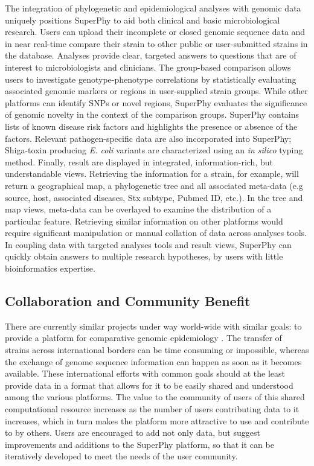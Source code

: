 \documentclass[a4paper,twoside]{article}
\begin{document}
The integration of phylogenetic and epidemiological analyses with genomic data uniquely positions SuperPhy to aid both clinical and basic microbiological research. Users can upload their incomplete or closed genomic sequence data and in near real-time compare their strain to other public or user-submitted strains in the database. Analyses provide clear, targeted answers to questions that are of interest to microbiologists and clinicians.  The group-based comparison allows users to investigate genotype-phenotype correlations by statistically evaluating associated genomic markers or regions in user-supplied strain groups. While other platforms can identify SNPs or novel regions, SuperPhy evaluates the significance of genomic novelty in the context of the comparison groups. SuperPhy contains lists of known disease risk factors and highlights the presence or absence of the factors. Relevant pathogen-specific data are also incorporated into SuperPhy; Shiga-toxin producing \textit{E. coli} variants are characterized using an \textit{in silico} typing method. Finally, result are displayed in integrated, information-rich, but understandable views. Retrieving the information for a strain, for example, will return a geographical map, a phylogenetic tree and all associated meta-data (e.g source, host, associated diseases, Stx subtype, Pubmed ID, etc.). In the tree and map views, meta-data can be overlayed to examine the distribution of a particular feature.  Retrieving similar information on other platforms would require significant manipulation or manual collation of data across analyses tools. In coupling data with targeted analyses tools and result views, SuperPhy can quickly obtain answers to multiple research hypotheses, by users with little bioinformatics expertise.

\subsection{Collaboration and Community Benefit}
\label{sec:collaboration}
There are currently similar projects under way world-wide with similar goals: to provide a platform for comparative genomic epidemiology \cite{kupferschmidt_outbreak_2011}. The transfer of strains across international borders can be time consuming or impossible, whereas the exchange of genome sequence information can happen as soon as it becomes available. These international efforts with common goals should at the least provide data in a format that allows for it to be easily shared and understood among the various platforms. The value to the community of users of this shared computational resource increases as the number of users contributing data to it increases, which in turn makes the platform more attractive to use and contribute to by others. Users are encouraged to add not only data, but suggest improvements and additions to the SuperPhy platform, so that it can be iteratively developed to meet the needs of the user community.
\end{document}
